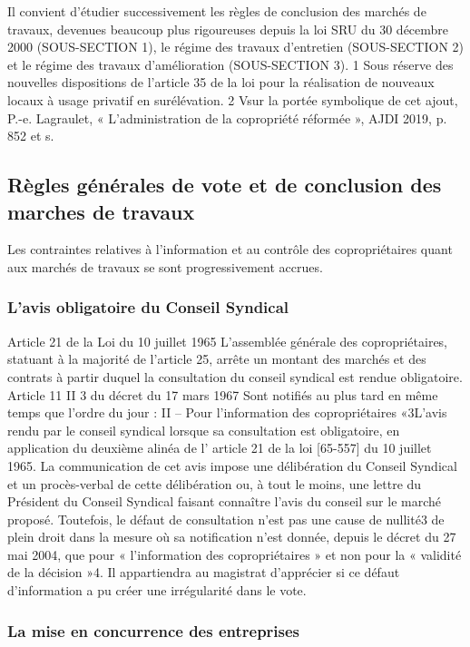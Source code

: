 	Il convient d’étudier successivement les règles de conclusion des marchés de travaux, devenues beaucoup plus rigoureuses depuis la loi SRU du 30 décembre 2000 (SOUS-SECTION 1), le régime des travaux d’entretien (SOUS-SECTION 2) et le régime des travaux d’amélioration (SOUS-SECTION 3).
	1 Sous réserve des nouvelles dispositions de l’article 35 de la loi pour la réalisation de nouveaux locaux à usage privatif en surélévation.
	2 V\degres sur la portée symbolique de cet ajout, P.-e. Lagraulet, « L’administration de la copropriété réformée », AJDI 2019, p. 852 et s.
	
	\subsection{Règles générales de vote et de conclusion des marches de travaux}
	
		Les contraintes relatives à l’information et au contrôle des copropriétaires quant aux marchés de travaux se sont progressivement accrues.
		
		\subsubsection{L’avis obligatoire du Conseil Syndical}
		
			Article 21 de la Loi du 10 juillet 1965
			L'assemblée générale des copropriétaires, statuant à la majorité de l'article 25, arrête un montant des marchés et des contrats à partir duquel la consultation du conseil syndical est rendue obligatoire.
			Article 11 II 3 du décret du 17 mars 1967
			Sont notifiés au plus tard en même temps que l'ordre du jour :
			II – Pour l’information des copropriétaires
			«3\degres L'avis rendu par le conseil syndical lorsque sa consultation est obligatoire, en application du deuxième alinéa de l' article 21 de la loi [65-557] du 10 juillet 1965.
			La communication de cet avis impose une délibération du Conseil Syndical et un procès-verbal de cette délibération ou, à tout le moins, une lettre du Président du Conseil Syndical faisant connaître l’avis du conseil sur le marché proposé.
			Toutefois, le défaut de consultation n’est pas une cause de nullité3 de plein droit dans la mesure où sa notification n’est donnée, depuis le décret du 27 mai 2004, que pour « l’information des copropriétaires » et non pour la « validité de la décision »4. Il appartiendra au magistrat d’apprécier si ce défaut d’information a pu créer une irrégularité dans le vote.
			
		\subsubsection{La mise en concurrence des entreprises}
		
